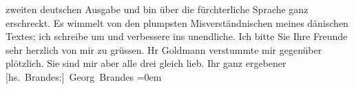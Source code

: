 \begin{ledgroupsized}[t]{13cm}
               zweiten deutschen Ausgabe und bin über die fürchterliche Sprache ganz erschreckt. Es
               wimmelt von den plumpsten Misverständnischen meines dänischen Textes; ich schreibe um und verbessere ins unendliche.\pend
           \pstart
           Ich bitte Sie Ihre Freunde sehr herzlich von mir zu grüssen. Hr Goldmann verstummte mir gegenüber plötzlich. Sie sind mir aber
               alle drei gleich lieb.\pend
           \pstart
           Ihr ganz ergebener{\\[\baselineskip]}\spacefill\mbox{{[}hs. Brandes:{]} Georg Brandes}\pend
           \leftskip=0em{}
         
         \endnumbering{}\end{ledgroupsized}  \newcommand{\dateiname}{L00701}\newcommand{\titel}{Georg Brandes an Arthur Schnitzler, [13. 7. 1897]}\newcommand{\editorInnen}{Martin Anton Müller und Gerd-Hermann Susen}
      
